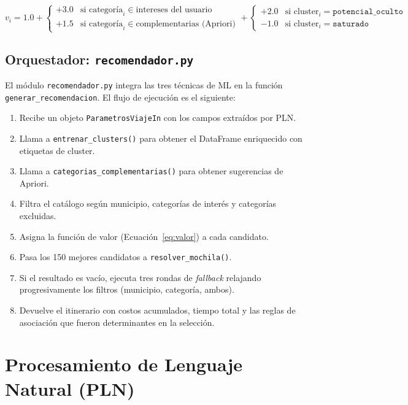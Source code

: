 \documentclass[12pt,letterpaper]{report}
\begin{document}
\begin{equation}
  v_i = 1.0 +
  \begin{cases}
    +3.0 & \text{si } \text{categoría}_i \in \text{intereses del usuario} \\
    +1.5 & \text{si } \text{categoría}_i \in \text{complementarias (Apriori)}
  \end{cases}
  +
  \begin{cases}
    +2.0 & \text{si cluster}_i = \texttt{potencial\_oculto} \\
    -1.0 & \text{si cluster}_i = \texttt{saturado}
  \end{cases}
  \label{eq:valor}
\end{equation}

\subsection{Orquestador: \texttt{recomendador.py}}

El módulo \texttt{recomendador.py} integra las tres técnicas de ML en la función
\texttt{generar\_recomendacion}. El flujo de ejecución es el siguiente:

\begin{enumerate}[leftmargin=2cm]
  \item Recibe un objeto \texttt{ParametrosViajeIn} con los campos extraídos por PLN.
  \item Llama a \texttt{entrenar\_clusters()} para obtener el DataFrame enriquecido con
        etiquetas de cluster.
  \item Llama a \texttt{categorias\_complementarias()} para obtener sugerencias de Apriori.
  \item Filtra el catálogo según municipio, categorías de interés y categorías excluidas.
  \item Asigna la función de valor (Ecuación~\ref{eq:valor}) a cada candidato.
  \item Pasa los 150 mejores candidatos a \texttt{resolver\_mochila()}.
  \item Si el resultado es vacío, ejecuta tres rondas de \textit{fallback} relajando
        progresivamente los filtros (municipio, categoría, ambos).
  \item Devuelve el itinerario con costos acumulados, tiempo total y las reglas de
        asociación que fueron determinantes en la selección.
\end{enumerate}

\section{Procesamiento de Lenguaje Natural (PLN)}
\end{document}
